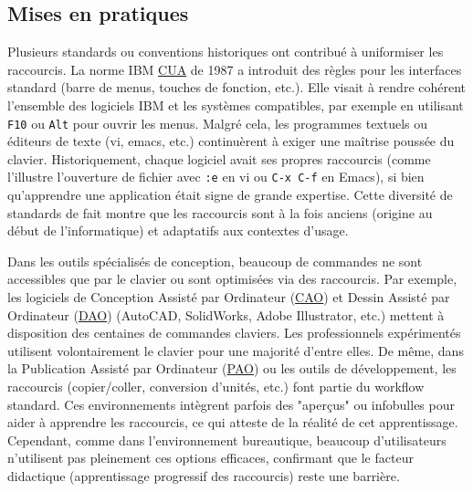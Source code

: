 \documentclass[a4paper,12pt]{article}
\begin{document}
\subsection{Mises en pratiques}
\label{sec:orgda9cab3}
Plusieurs standards ou conventions historiques ont contribué à uniformiser les raccourcis. La norme IBM \protect\hyperlink{gls-1}{\label{gls-1-use-2}CUA} de 1987 a introduit des règles pour les interfaces standard (barre de menus, touches de fonction, etc.)\autocite{berryEvolutionCommonUser1992}. Elle visait à rendre cohérent l'ensemble des logiciels IBM et les systèmes compatibles, par exemple en utilisant \texttt{F10} ou \texttt{Alt} pour ouvrir les menus. Malgré cela, les programmes textuels ou éditeurs de texte (vi, emacs, etc.) continuèrent à exiger une maîtrise poussée du clavier. Historiquement, chaque logiciel avait ses propres raccourcis (comme l’illustre l'ouverture de fichier avec \texttt{:e} en vi ou \texttt{C-x C-f} en Emacs), si bien qu’apprendre une application était signe de grande expertise. Cette diversité de standards de fait montre que les raccourcis sont à la fois anciens (origine au début de l’informatique) et adaptatifs aux contextes d'usage.

Dans les outils spécialisés de conception, beaucoup de commandes ne sont accessibles que par le clavier ou sont optimisées via des raccourcis. Par exemple, les logiciels de Conception Assisté par Ordinateur
 (\protect\hyperlink{gls-5}{\label{gls-5-use-1}CAO}) et Dessin Assisté par Ordinateur	
 (\protect\hyperlink{gls-6}{\label{gls-6-use-1}DAO}) (AutoCAD, SolidWorks, Adobe Illustrator, etc.) mettent à disposition des centaines de commandes claviers. Les professionnels expérimentés utilisent volontairement le clavier pour une majorité d’entre elles. De même, dans la Publication Assisté par Ordinateur
 (\protect\hyperlink{gls-7}{\label{gls-7-use-1}PAO}) ou les outils de développement, les raccourcis (copier/coller, conversion d'unités, etc.) font partie du workflow standard. Ces environnements intègrent parfois des "aperçus" ou infobulles pour aider à apprendre les raccourcis, ce qui atteste de la réalité de cet apprentissage. Cependant, comme dans l'environnement bureautique, beaucoup d'utilisateurs n'utilisent pas pleinement ces options efficaces, confirmant que le facteur didactique (apprentissage progressif des raccourcis) reste une barrière.
\end{document}

